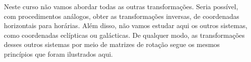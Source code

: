 Neste curso não vamos abordar todas as outras transformações. Seria possível, com procedimentos análogos, obter as transformações inversas, de coordenadas horizontais para horárias. Além disso, não vamos estudar aqui os outros sistemas, como coordenadas eclípticas ou galácticas. De qualquer modo, as transformações desses outros sistemas por meio de matrizes de rotação segue os mesmos princípios que foram ilustrados aqui.
